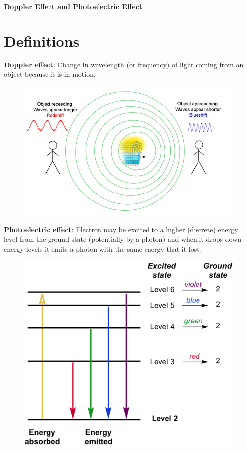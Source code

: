 \documentclass[12pt]{article}
\begin{document}
    {\Large \textbf{Doppler Effect and Photoelectric Effect} \par}

    \section*{Definitions}
    \textbf{Doppler effect}: Change in wavelength (or frequency) of light coming from an object because
    it is in motion.

    \begin{figure}[h]
        \includegraphics[scale = 0.5]{doppler_shift_light.png}
    \end{figure}

    \noindent \textbf{Photoelectric effect}: Electron may be excited to a higher (discrete) energy level from the ground state 
    (potentially by a photon) and when it drops down energy levels it emits a photon with the same energy that it lost.

    \begin{figure}[ht]
        \includegraphics[scale = 0.5]{b8cb777559d81c6a6640187549bcd3907ebf0573.png}
    \end{figure}
\end{document}
